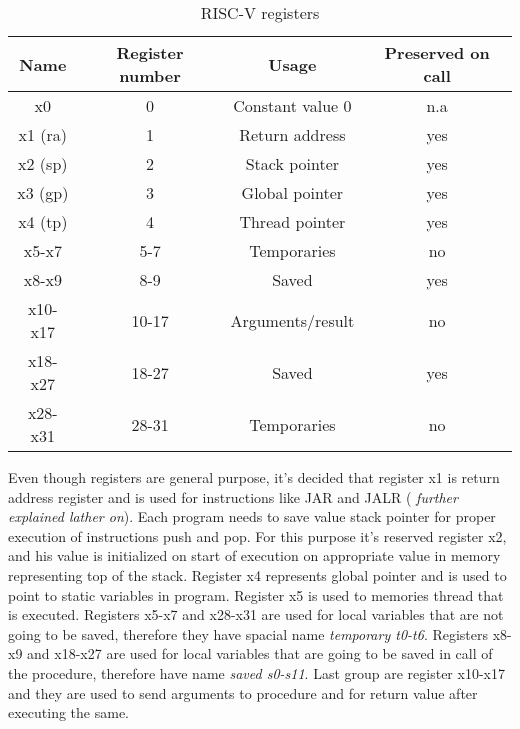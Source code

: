 \documentclass{scrreprt}
\begin{document}
    \begin{table}[ht]
        \centering
        \begin{tabular}{|c|c|c|c|} \hline 
            Name & Register number & Usage & Preserved on call\\ \hline 
            x0 & 0 & Constant value 0 & n.a\\ \hline 
            x1 (ra) & 1 & Return address & yes\\ \hline 
            x2 (sp) & 2 & Stack pointer & yes\\ \hline 
            x3 (gp) & 3 & Global pointer & yes\\ \hline 
            x4 (tp) & 4 & Thread pointer & yes\\ \hline 
            x5-x7 & 5-7 & Temporaries & no \\ \hline 
            x8-x9 & 8-9 & Saved & yes\\ \hline 
            x10-x17 & 10-17 & Arguments/result & no\\ \hline 
            x18-x27 & 18-27 & Saved & yes\\ \hline 
            x28-x31 & 28-31 & Temporaries & no\\ \hline
        \end{tabular}
        \caption{RISC-V registers}
        \label{tab:table3}
    \end{table}

    Even though registers are general purpose, it's decided that register x1 is return address register and is used for instructions like JAR and JALR ( \textit{further explained lather on}). Each program needs to save value stack pointer for proper execution of instructions push and pop. For this purpose it's reserved register x2, and his value is initialized on start of execution on appropriate value in memory representing top of the stack. Register x4 represents global pointer and is used to point to static variables in program. Register x5 is used to memories thread that is executed. Registers x5-x7 and x28-x31 are used for local variables that are not going to be saved, therefore they have spacial name \textit{temporary t0-t6}. Registers x8-x9 and x18-x27 are used for local variables that are going to be saved in call of the procedure, therefore have name \textit{saved s0-s11}. Last group are register x10-x17 and they are used to send arguments to procedure and for return value after executing the same.  
    
\end{document}
